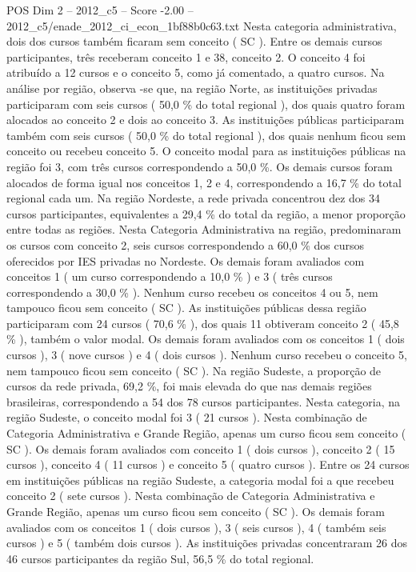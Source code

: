 \begin{textsample}{POS Dim 2 – 2012\_c5 – Score -2.00 – 2012\_c5/enade\_2012\_ci\_econ\_1bf88b0c63.txt}
Nesta categoria administrativa, dois dos cursos também ficaram sem conceito ( SC ).
Entre os demais cursos participantes, três receberam conceito 1 e 38, conceito 2.
O conceito 4 foi atribuído a 12 cursos e o conceito 5, como já comentado, a quatro cursos.
Na análise por região, observa -se que, na região Norte, as instituições privadas participaram com seis cursos ( 50,0 \% do total regional ), dos quais quatro foram alocados ao conceito 2 e dois ao conceito 3.
As instituições públicas participaram também com seis cursos ( 50,0 \% do total regional ), dos quais nenhum ficou sem conceito ou recebeu conceito 5.
O conceito modal para as instituições públicas na região foi 3, com três cursos correspondendo a 50,0 \%.
Os demais cursos foram alocados de forma igual nos conceitos 1, 2 e 4, correspondendo a 16,7 \% do total regional cada um.
Na região Nordeste, a rede privada concentrou dez dos 34 cursos participantes, equivalentes a 29,4 \% do total da região, a menor proporção entre todas as regiões.
Nesta Categoria Administrativa na região, predominaram os cursos com conceito 2, seis cursos correspondendo a 60,0 \% dos cursos oferecidos por IES privadas no Nordeste.
Os demais foram avaliados com conceitos 1 ( um curso correspondendo a 10,0 \% ) e 3 ( três cursos correspondendo a 30,0 \% ).
Nenhum curso recebeu os conceitos 4 ou 5, nem tampouco ficou sem conceito ( SC ).
As instituições públicas dessa região participaram com 24 cursos ( 70,6 \% ), dos quais 11 obtiveram conceito 2 ( 45,8 \% ), também o valor modal.
Os demais foram avaliados com os conceitos 1 ( dois cursos ), 3 ( nove cursos ) e 4 ( dois cursos ).
Nenhum curso recebeu o conceito 5, nem tampouco ficou sem conceito ( SC ).
Na região Sudeste, a proporção de cursos da rede privada, 69,2 \%, foi mais elevada do que nas demais regiões brasileiras, correspondendo a 54 dos 78 cursos participantes.
Nesta categoria, na região Sudeste, o conceito modal foi 3 ( 21 cursos ).
Nesta combinação de Categoria Administrativa e Grande Região, apenas um curso ficou sem conceito ( SC ).
Os demais foram avaliados com conceito 1 ( dois cursos ), conceito 2 ( 15 cursos ), conceito 4 ( 11 cursos ) e conceito 5 ( quatro cursos ).
Entre os 24 cursos em instituições públicas na região Sudeste, a categoria modal foi a que recebeu conceito 2 ( sete cursos ).
Nesta combinação de Categoria Administrativa e Grande Região, apenas um curso ficou sem conceito ( SC ).
Os demais foram avaliados com os conceitos 1 ( dois cursos ), 3 ( seis cursos ), 4 ( também seis cursos ) e 5 ( também dois cursos ).
As instituições privadas concentraram 26 dos 46 cursos participantes da região Sul, 56,5 \% do total regional.

\end{textsample}
